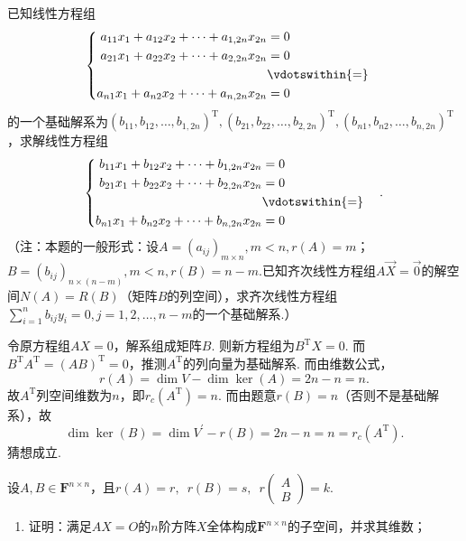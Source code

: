 \begin{exercise}
\begin{exgroup}
        \item 已知线性方程组
        \[\begin{cases} \begin{aligned}
                    a_{11}x_1+a_{12}x_2+\cdots+a_{1,2n}x_{2n} & =0              \\
                    a_{21}x_1+a_{22}x_2+\cdots+a_{2,2n}x_{2n} & =0              \\
                                                              & \vdotswithin{=} \\
                    a_{n1}x_1+a_{n2}x_2+\cdots+a_{n,2n}x_{2n} & =0              \\
                \end{aligned}\end{cases}\]
        的一个基础解系为$(b_{11},b_{12},\ldots,b_{1,2n})^\mathrm{T},(b_{21},b_{22},\ldots,b_{2,2n})^\mathrm{T},(b_{n1},b_{n2},\ldots,b_{n,2n})^\mathrm{T}$，求解线性方程组
        \[\begin{cases} \begin{aligned}
                    b_{11}x_1+b_{12}x_2+\cdots+b_{1,2n}x_{2n} & =0              \\
                    b_{21}x_1+b_{22}x_2+\cdots+b_{2,2n}x_{2n} & =0              \\
                                                              & \vdotswithin{=} \\
                    b_{n1}x_1+b_{n2}x_2+\cdots+b_{n,2n}x_{2n} & =0              \\
                \end{aligned} \end{cases}.\]
        （注：本题的一般形式：设$A=(a_{ij})_{m\times n},m<n,r(A)=m$；$B=(b_{ij})_{n\times(n-m)},m<n,r(B)=n-m$.已知齐次线性方程组$A\vec{X}=\vec{0}$的解空间$N(A)=R(B)$（矩阵$B$的列空间），求齐次线性方程组$\displaystyle\sum_{i=1}^{n}b_{ij}y_i=0,j=1,2,\ldots,n-m$的一个基础解系.）
        \begin{answer}
            令原方程组$AX=0$，解系组成矩阵$B$. 则新方程组为$B^\mathrm{T}X=0$. 而$B^\mathrm{T}A^\mathrm{T}=(AB)^\mathrm{T}=0$，推测$A^\mathrm{T}$的列向量为基础解系. 而由维数公式，
          \[ r(A)=\dim V-\dim\ker(A) = 2n-n=n. \]
          故$A^\mathrm{T}$列空间维数为$n$，即$r_c(A^\mathrm{T})=n$. 而由题意$r(B)=n$（否则不是基础解系），故
          \[ \dim{\ker(B)}=\dim{V^{\prime}}-r(B)=2n-n=n=r_c(A^\mathrm{T}). \]
          猜想成立.
        \end{answer}

        \item 设$A,B\in \mathbf{F}^{n\times n}$，且$r(A)=r,\enspace r(B)=s,\enspace r\begin{pmatrix} A \\ B \end{pmatrix}=k$.
        \begin{enumerate}
            \item 证明：满足$AX=O$的$n$阶方阵$X$全体构成$\mathbf{F}^{n\times n}$的子空间，并求其维数；


\end{enumerate}
\end{exgroup}
\end{exercise}
